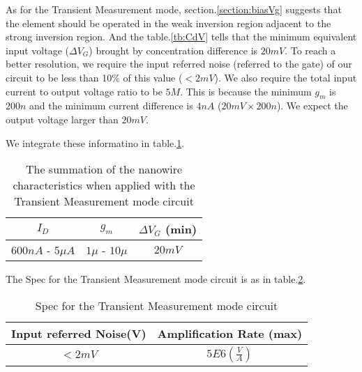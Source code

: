 As for the Transient Measurement mode, section.\ref{section:biasVg} suggests that the element should be operated in the weak inversion region adjacent to the strong inversion region.
And the table.\ref{tb:CdV} tells that the minimum equivalent input voltage ($\Delta V_G$) brought by concentration difference is $20mV$.
To reach a better resolution, we require the input referred noise (referred to the gate) of our circuit to be less than 10\% of this value ($< 2mV$).
We also require the total input current to output voltage ratio to be $5M$.
This is because the minimum $g_m$ is $200n$ and the minimum current difference is $4n A$ ($20mV \times 200n$).
We expect the output voltage larger than $20mV$.

We integrate these informatino in table.\ref{tb:ACinput}.
\begin{table}[!htbp]
    {\fontfamily{}\fontsize{10}{14}\selectfont
    \centering
    \begin{tabular}{c|c|c}
        $I_D$ & $g_m$ & $\Delta V_G$ (min)\\
        \hline
        $600n A$ - $5\mu A$ & $1\mu $ - $10\mu$ & $20mV$\\
    \end{tabular}
    \caption{The summation of the nanowire characteristics when applied with the Transient Measurement mode circuit}
    \label{tb:ACinput}
    }
\end{table}
The Spec for the Transient Measurement mode circuit is as in table.\ref{tb:ACSpec}.
\begin{table}[!htbp]
    {\fontfamily{}\fontsize{10}{14}\selectfont
    \centering
    \begin{tabular}{c|c}
        Input referred Noise(V) & Amplification Rate (max) \\
        \hline
        $< 2m V$ & $5E6(\frac{V}{A})$\\
    \end{tabular}
    \caption{Spec for the Transient Measurement mode circuit}
    \label{tb:ACSpec}
    }
\end{table}





 

